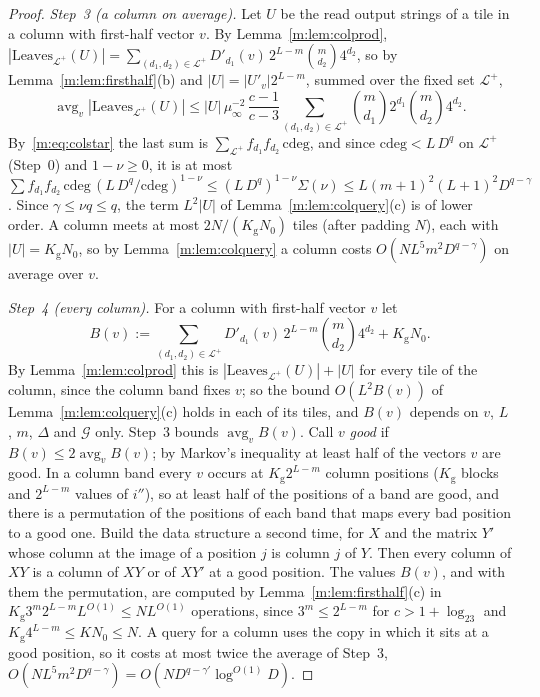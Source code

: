 \documentclass[11pt]{article}
\theoremstyle{definition}
\theoremstyle{remark}
\newcommand{\Leaves}{\mathrm{Leaves}}
\newcommand{\Nz}{N_0}
\newcommand{\Qg}{\mathcal{G}}
\newcommand{\Kg}{K_{\mathrm g}}
\begin{document}
\begin{proof}
\emph{Step~3 (a column on average).} Let $U$ be the read output strings of a tile in a column with first-half vector $v$. By Lemma~\ref{m:lem:colprod}, $|\Leaves_{\mathcal L^+}(U)|=\sum_{(d_1,d_2)\in\mathcal L^+}D'_{d_1}(v)\,2^{L-m}\binom m{d_2}4^{d_2}$, so by Lemma~\ref{m:lem:firsthalf}(b) and $|U|=|U'_v|2^{L-m}$, summed over the fixed set $\mathcal L^+$,
\[
\operatorname{avg}_v|\Leaves_{\mathcal L^+}(U)|\le|U|\,\mu_\infty^{-2}\,\frac{c-1}{c-3}\sum_{(d_1,d_2)\in\mathcal L^+}\binom m{d_1}2^{d_1}\binom m{d_2}4^{d_2}.
\]
By~\eqref{m:eq:colstar} the last sum is $\sum_{\mathcal L^+}f_{d_1}f_{d_2}\,\mathrm{cdeg}$, and since $\mathrm{cdeg}<L\,D^q$ on $\mathcal L^+$ (Step~0) and $1-\nu\ge0$, it is at most $\sum f_{d_1}f_{d_2}\,\mathrm{cdeg}\,(L\,D^q/\mathrm{cdeg})^{1-\nu}\le(L\,D^q)^{1-\nu}\Sigma(\nu)\le L(m+1)^2(L+1)^2D^{q-\gamma}$. Since $\gamma\le\nu q\le q$, the term $L^2|U|$ of Lemma~\ref{m:lem:colquery}(c) is of lower order. A column meets at most $2N/(\Kg\Nz)$ tiles (after padding $N$), each with $|U|=\Kg\Nz$, so by Lemma~\ref{m:lem:colquery} a column costs $O(N L^5m^2D^{q-\gamma})$ on average over $v$.

\emph{Step~4 (every column).} For a column with first-half vector $v$ let
\[
B(v):=\sum_{(d_1,d_2)\in\mathcal L^+}D'_{d_1}(v)\,2^{L-m}\binom m{d_2}4^{d_2}+\Kg\Nz.
\]
By Lemma~\ref{m:lem:colprod} this is $|\Leaves_{\mathcal L^+}(U)|+|U|$ for every tile of the column, since the column band fixes $v$; so the bound $O(L^2B(v))$ of Lemma~\ref{m:lem:colquery}(c) holds in each of its tiles, and $B(v)$ depends on $v$, $L$, $m$, $\Delta$ and $\Qg$ only. Step~3 bounds $\operatorname{avg}_vB(v)$. Call $v$ \emph{good} if $B(v)\le2\operatorname{avg}_vB(v)$; by Markov's inequality at least half of the vectors $v$ are good. In a column band every $v$ occurs at $\Kg2^{L-m}$ column positions ($\Kg$ blocks and $2^{L-m}$ values of $i''$), so at least half of the positions of a band are good, and there is a permutation of the positions of each band that maps every bad position to a good one. Build the data structure a second time, for $X$ and the matrix $Y'$ whose column at the image of a position $j$ is column $j$ of $Y$. Then every column of $XY$ is a column of $XY$ or of $XY'$ at a good position. The values $B(v)$, and with them the permutation, are computed by Lemma~\ref{m:lem:firsthalf}(c) in $\Kg3^m2^{L-m}L^{O(1)}\le NL^{O(1)}$ operations, since $3^m\le2^{L-m}$ for $c>1+\log_23$ and $\Kg4^{L-m}\le K\Nz\le N$. A query for a column uses the copy in which it sits at a good position, so it costs at most twice the average of Step~3, $O(NL^5m^2D^{q-\gamma})=O(ND^{q-\gamma'}\log^{O(1)}\!D)$.


\end{proof}
\end{document}
